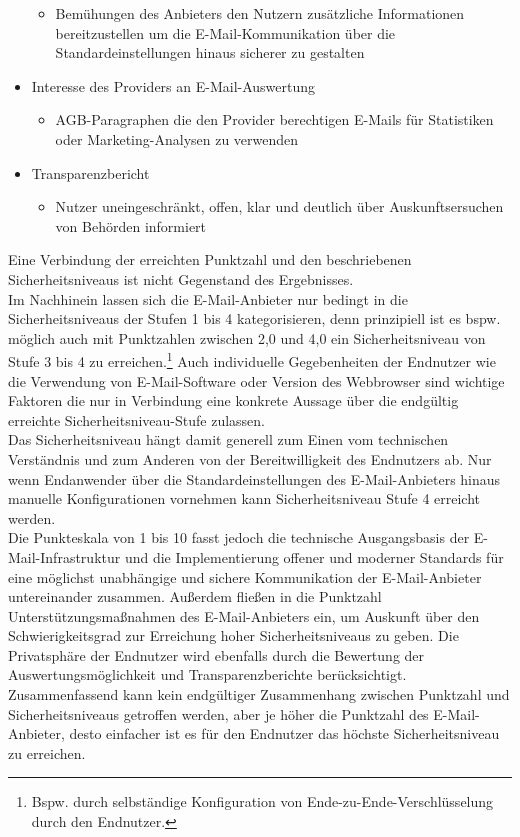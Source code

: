 \documentclass  [paper=a4,
				fontsize=12pt,
				listof=totoc,
				bibliography=totoc
				]{scrreprt}
\begin{document}
\begin{smaller}
\begin{itemize}
				\begin{itemize}
					\item Bemühungen des Anbieters den Nutzern zusätzliche Informationen bereitzustellen um die E-Mail-Kommunikation über die Standardeinstellungen hinaus sicherer zu gestalten
				\end{itemize}			
				\item Interesse des Providers an E-Mail-Auswertung
				\begin{itemize}
					\item AGB-Paragraphen die den Provider berechtigen E-Mails für Statistiken oder Marketing-Analysen zu verwenden
				\end{itemize}				
				\item Transparenzbericht
				\begin{itemize}
					\item Nutzer uneingeschränkt, offen, klar und deutlich über Auskunftsersuchen von Behörden informiert
				\end{itemize}
			\end{itemize} 
			\end{smaller} 					

			Eine Verbindung der erreichten Punktzahl und den beschriebenen Sicherheitsniveaus ist nicht Gegenstand des Ergebnisses.\medskip\\
			Im Nachhinein lassen sich die E-Mail-Anbieter nur bedingt in die Sicherheitsniveaus der Stufen 1 bis 4 kategorisieren, denn prinzipiell ist es bspw. möglich auch mit Punktzahlen zwischen 2,0 und 4,0 ein Sicherheitsniveau von Stufe 3 bis 4 zu erreichen.\footnote{Bspw. durch selbständige Konfiguration von Ende-zu-Ende-Verschlüsselung durch den Endnutzer.}
			Auch individuelle Gegebenheiten der Endnutzer wie die Verwendung von E-Mail-Software oder Version des Webbrowser sind wichtige Faktoren die nur in Verbindung eine konkrete Aussage über die endgültig erreichte Sicherheitsniveau-Stufe zulassen.\medskip\\
			Das Sicherheitsniveau hängt damit generell zum Einen vom technischen Verständnis und zum Anderen von der Bereitwilligkeit des Endnutzers ab.
			Nur wenn Endanwender über die Standardeinstellungen des E-Mail-Anbieters hinaus manuelle Konfigurationen vornehmen kann Sicherheitsniveau Stufe 4 erreicht werden.\medskip\\
			Die Punkteskala von 1 bis 10 fasst jedoch die technische Ausgangsbasis der E-Mail-Infrastruktur und die Implementierung offener und moderner Standards für eine möglichst unabhängige und sichere Kommunikation der E-Mail-Anbieter untereinander zusammen.
			Außerdem fließen in die Punktzahl Unterstützungsmaßnahmen des E-Mail-Anbieters ein, um Auskunft über den Schwierigkeitsgrad zur Erreichung hoher Sicherheitsniveaus zu geben.
			Die Privatsphäre der Endnutzer wird ebenfalls durch die Bewertung der Auswertungsmöglichkeit und Transparenzberichte berücksichtigt.\medskip\\
			Zusammenfassend kann kein endgültiger Zusammenhang zwischen Punktzahl und Sicherheitsniveaus getroffen werden, aber je höher die Punktzahl des E-Mail-Anbieter, desto einfacher ist es für den Endnutzer das höchste Sicherheitsniveau zu erreichen.
			
\end{document}
